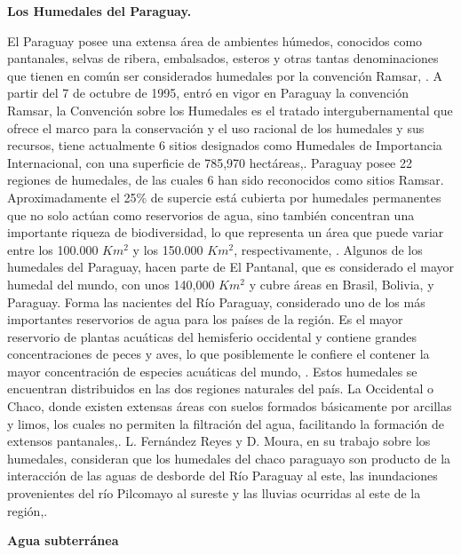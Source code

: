 \textbf{Los Humedales del  Paraguay.}

El Paraguay posee una extensa \'area de ambientes h\'umedos, conocidos como pantanales, selvas de ribera, embalsados, esteros y otras tantas denominaciones que tienen en com\'un ser considerados humedales por la convenci\'on Ramsar, \cite{salas-duenas-2015}. A partir del 7 de octubre de 1995, entr\'o en vigor en Paraguay la convención Ramsar, la Convención sobre los Humedales es el tratado intergubernamental que ofrece el marco para la conservación y el uso racional de los humedales y sus recursos, tiene actualmente 6 sitios designados como Humedales de Importancia Internacional, con una superficie de 785,970 hectáreas,\cite{ramsarWEB}.
Paraguay posee 22 regiones de humedales, de las cuales 6 han sido reconocidos como sitios Ramsar. Aproximadamente el 25\% de supercie está cubierta por humedales permanentes que no solo actúan como reservorios de agua, sino también concentran una importante
riqueza de biodiversidad, lo que representa un \'area que puede variar entre los 100.000 $Km^2$ y los 150.000 $Km^2$, respectivamente, \cite{mereles1998humedales}.
Algunos de los humedales del Paraguay, hacen parte de El Pantanal, que es considerado el mayor humedal del mundo, con unos 140,000 $Km^2$ y cubre \'areas en Brasil, Bolivia, y Paraguay. Forma las nacientes del R\'io Paraguay, considerado uno de los m\'as importantes reservorios de agua para los pa\'ises de la regi\'on.
Es el mayor reservorio de plantas acu\'aticas del hemisferio occidental y contiene grandes concentraciones de peces y aves, lo que posiblemente le confiere el contener la mayor concentraci\'on de especies acu\'aticas del mundo, \cite{willink2000biological}.
Estos humedales se encuentran distribuidos en las dos regiones naturales del pa\'is. La Occidental o Chaco, donde existen extensas \'areas con suelos formados b\'asicamente por arcillas y limos, los cuales no permiten la filtraci\'on del agua, facilitando la formaci\'on de extensos pantanales,\cite{vera2000iniciativas}.
L. Fernández Reyes y D. Moura, en su trabajo sobre los humedales, consideran que los humedales del chaco paraguayo son producto de la interacci\'on de las aguas de desborde del R\'io Paraguay al este, las inundaciones provenientes del r\'io Pilcomayo al sureste y las lluvias ocurridas al este de la regi\'on,\cite{fernandez2005humedales}.

\textbf{Agua subterránea}

